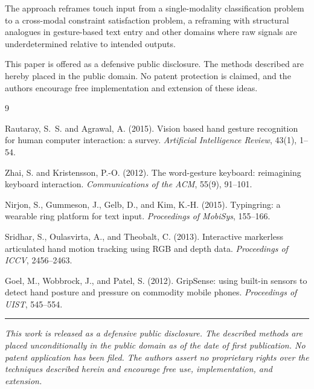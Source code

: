\documentclass[11pt,letterpaper]{article}
\begin{document}
The approach reframes touch input from a single-modality classification problem to
a cross-modal constraint satisfaction problem, a reframing with structural analogues
in gesture-based text entry and other domains where raw signals are underdetermined
relative to intended outputs.

This paper is offered as a defensive public disclosure. The methods described are
hereby placed in the public domain. No patent protection is claimed, and the authors
encourage free implementation and extension of these ideas.

\newpage
\begin{thebibliography}{9}

Rautaray, S.~S. and Agrawal, A. (2015).
Vision based hand gesture recognition for human computer interaction: a survey.
\textit{Artificial Intelligence Review}, 43(1), 1--54.

Zhai, S. and Kristensson, P.-O. (2012).
The word-gesture keyboard: reimagining keyboard interaction.
\textit{Communications of the ACM}, 55(9), 91--101.

Nirjon, S., Gummeson, J., Gelb, D., and Kim, K.-H. (2015).
Typingring: a wearable ring platform for text input.
\textit{Proceedings of MobiSys}, 155--166.

Sridhar, S., Oulasvirta, A., and Theobalt, C. (2013).
Interactive markerless articulated hand motion tracking using RGB and depth data.
\textit{Proceedings of ICCV}, 2456--2463.

Goel, M., Wobbrock, J., and Patel, S. (2012).
GripSense: using built-in sensors to detect hand posture and pressure on commodity
mobile phones.
\textit{Proceedings of UIST}, 545--554.

\end{thebibliography}

\vspace{16pt}
\hrule
\vspace{8pt}
\noindent\small\textit{This work is released as a defensive public disclosure.
The described methods are placed unconditionally in the public domain as of the
date of first publication. No patent application has been filed. The authors assert
no proprietary rights over the techniques described herein and encourage free
use, implementation, and extension.}
\end{document}
